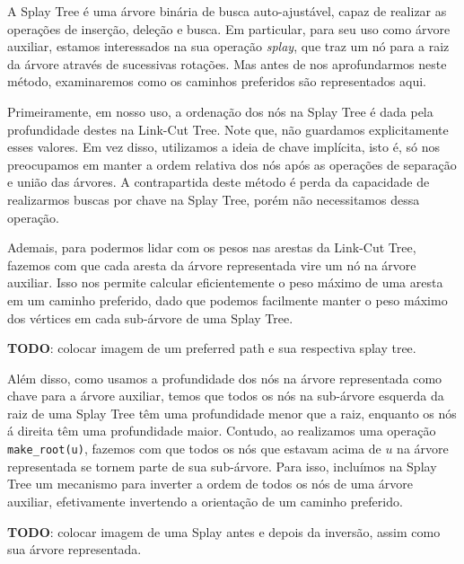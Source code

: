 A Splay Tree é uma árvore binária de busca auto-ajustável, capaz de realizar as operações de inserção, deleção e busca. Em particular, para seu uso como árvore auxiliar, estamos interessados na sua operação \emph{splay}, que traz um nó para a raiz da árvore através de sucessivas rotações. Mas antes de nos aprofundarmos neste método, examinaremos como os caminhos preferidos são representados aqui.

Primeiramente, em nosso uso, a ordenação dos nós na Splay Tree é dada pela profundidade destes na Link-Cut Tree. Note que, não guardamos explicitamente esses valores. Em vez disso, utilizamos a ideia de chave implícita, isto é, só nos preocupamos em manter a ordem relativa dos nós após as operações de separação e união das árvores. A contrapartida deste método é perda da capacidade de realizarmos buscas por chave na Splay Tree, porém não necessitamos dessa operação.

Ademais, para podermos lidar com os pesos nas arestas da Link-Cut Tree, fazemos com que cada aresta da árvore representada vire um nó na árvore auxiliar. Isso nos permite calcular eficientemente o peso máximo de uma aresta em um caminho preferido, dado que podemos facilmente manter o peso máximo dos vértices em cada sub-árvore de uma Splay Tree.

\begin{center}
    \textbf{TODO}: colocar imagem de um preferred path e sua respectiva splay tree.
\end{center}

Além disso, como usamos a profundidade dos nós na árvore representada como chave para a árvore auxiliar, temos que todos os nós na sub-árvore esquerda da raiz de uma Splay Tree têm uma profundidade menor que a raiz, enquanto os nós á direita têm uma profundidade maior. Contudo, ao realizamos uma operação \texttt{make\_root(u)}, fazemos com que todos os nós que estavam acima de $u$ na árvore representada se tornem parte de sua sub-árvore. Para isso, incluímos na Splay Tree um mecanismo para inverter a ordem de todos os nós de uma árvore auxiliar, efetivamente invertendo a orientação de um caminho preferido.

\begin{center}
    \textbf{TODO}: colocar imagem de uma Splay antes e depois da inversão, assim como sua árvore representada.
\end{center}

